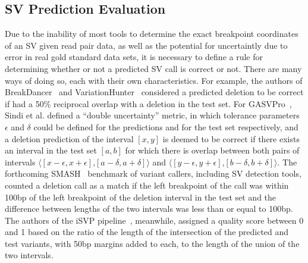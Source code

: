 \subsection{SV Prediction Evaluation}\label{section_prediction_evaluation}

Due to the inability of most tools to determine the exact breakpoint coordinates of an SV given read pair data, as well as the potential for uncertaintly due to error in real gold standard data sets, it is necessary to define a rule for determining whether or not a predicted SV call is correct or not. There are many ways of doing so, each with their own characteristics. For example, the authors of BreakDancer~\cite{Chen:2009p3} and VariationHunter~\cite{Hormozdiari:2009p284} considered a predicted deletion to be correct if had a 50\% reciprocal overlap with a deletion in the test set. For GASVPro~\cite{Sindi:2012kk}, Sindi et al. defined a ``double uncertainty'' metric, in which tolerance parameters $\epsilon$ and $\delta$ could be defined for the predictions and for the test set respectively, and a deletion prediction of the interval $[x,y]$ is deemed to be correct if there exists an interval in the test set $[a,b]$ for which there is overlap between both pairs of intervals $\langle[x-\epsilon,x+\epsilon]$,$[a-\delta,a+\delta]\rangle$ and $\langle[y-\epsilon,y+\epsilon]$,$[b-\delta,b+\delta]\rangle$. The forthcoming SMASH~\cite{2013arXiv1310.8420T} benchmark of variant callers, including SV detection tools, counted a deletion call as a match if the left breakpoint of the call was within 100bp of the left breakpoint of the deletion interval in the test set and the difference between lengths of the two intervals was less than or equal to 100bp. The authors of the iSVP pipeline~\cite{Mimori:2013wx}, meanwhile, assigned a quality score between 0 and 1 based on the ratio of the length of the intersection of the predicted and test variants, with 50bp margins added to each, to the length of the union of the two intervals. 

